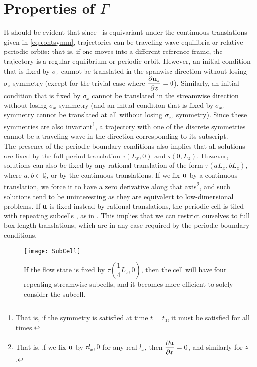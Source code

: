 \section{Properties of $\Gamma$}

It should be evident that since \pCf\ is equivariant under the continuous translations given in \eqref{eq:contsymm}, trajectories can be traveling wave equilibria or relative periodic orbits: that is, if one moves into a different reference frame, the trajectory is a regular equilibrium or periodic orbit. However, an initial condition that is fixed by $\sigma_z$ cannot be translated in the spanwise direction without losing $\sigma_z$ symmetry (except for the trivial case where $\pder{1}{\Vector{u}_z}{z} = 0$). Similarly, an initial condition that is fixed by $\sigma_x$ cannot be translated in the streamwise direction without losing $\sigma_x$ symmetry (and an initial condition that is fixed by $\sigma_{xz}$ symmetry cannot be translated at all without losing $\sigma_{xz}$ symmetry). Since these symmetries are also invariant\footnote{That is, if the symmetry is satisfied at time $t = t_0$, it must be satisfied for all times.}, a trajectory with one of the discrete symmetries cannot be a traveling wave in the direction corresponding to its subscript. \\

The presence of the periodic boundary conditions also implies that all solutions are fixed by the full-period translation $\tau(L_x,0)$ and $\tau(0,L_z)$. However, solutions can also be fixed by any rational translation of the form $\tau(a L_x,b L_z)$, where $a,b \in \mathbb{Q}$, or by the continuous translations. If we fix $\mathbf{u}$ by a continuous translation, we force it to have a zero derivative along that axis\footnote{That is, if we fix $\mathbf{u}$ by $\tau{l_x,0}$ for any real $l_x$, then $\pder{1}{\Vector{u}}{x} = 0$, and similarly for $z$.}, and such solutions tend to be uninteresting as they are equivalent to low-dimensional problems. If $\mathbf{u}$ is fixed instead by rational translations, the periodic cell is tiled with repeating subcells , as in . This implies that we can restrict ourselves to full box length translations, which are in any case required by the periodic boundary conditions.
 \begin{figure}[h]
\texttt{[image: SubCell]}
\caption{If the flow state is fixed by $\tau(\dfrac{1}{4}L_x,0)$, then the cell will have four repeating streamwise subcells, and it becomes more efficient to solely consider the subcell.}\label{fig:rationalTranslation}

\end{figure}

